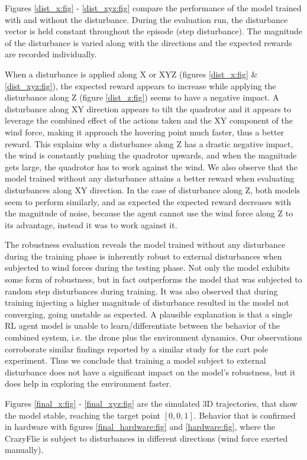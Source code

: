 \documentclass[../templateLTHtwocol.tex]{subfiles}
\begin{document}
Figures \ref{dist_x:fig} - \ref{dist_xyz:fig} compare the performance of the model trained with and without the disturbance. During the evaluation run, the disturbance vector is held constant throughout the episode (step disturbance). The magnitude of the disturbance is varied along with the directions and the expected rewards are recorded individually.

When a disturbance is applied along X or XYZ (figures \ref{dist_x:fig} \& \ref{dist_xyz:fig}), the expected reward appears to increase while applying the disturbance along Z (figure \ref{dist_z:fig}) seems to have a negative impact. A disturbance along XY direction appears to tilt the quadrotor and it appears to leverage the combined effect of the actions taken and the XY component of the wind force, making it approach the hovering point much faster, thus a better reward. This explains why a disturbance along Z has a drastic negative impact, the wind is constantly pushing the quadrotor upwards, and when the magnitude gets large, the quadrotor has to work against the wind. We also observe that the model trained without any disturbance attains a better reward when evaluating disturbances along XY direction. In the case of disturbance along Z, both models seem to perform similarly, and as expected the expected reward decreases with the magnitude of noise, because the agent cannot use the wind force along Z to its advantage, instead it was to work against it.

The robustness evaluation reveals the model trained without any disturbance during the training phase is inherently robust to external disturbances when subjected to wind forces during the testing phase. Not only the model exhibits some form of robustness, but in fact outperforms the model that was subjected to random step disturbances during training. It was also observed that during training injecting a higher magnitude of disturbance resulted in the model not converging, going unstable as expected.
 A plausible explanation is that a single RL agent model is unable to learn/differentiate between the behavior of the combined system, i.e. the drone plus the environment dynamics. Our observations corroborate similar findings reported by a similar study for the cart pole experiment\cite{charac_robustness}. Thus we conclude that training a model subject to external disturbance does not have a significant impact on the model's robustness, but it does help in exploring the environment faster.

Figures \ref{final_x:fig} - \ref{final_xyz:fig} are the simulated 3D trajectories, that show the model stable, reaching the target point $[0,0,1]$. Behavior that is confirmed in hardware with figures \ref{final_hardware:fig} and \ref{hardware:fig}, where the CrazyFlie is subject to disturbances in different directions (wind force exerted manually).
\end{document}
